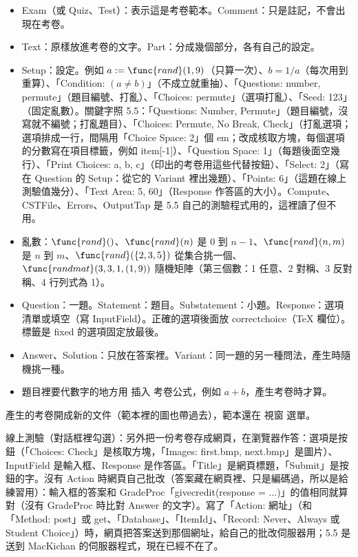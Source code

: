 \begin{itemize}
\item Exam（或 Quiz、Test）：表示這是考卷範本。Comment：只是註記，不會出現在考卷。
\item Text：原樣放進考卷的文字。Part：分成幾個部分，各有自己的設定。
\item Setup：設定。例如 $a:=\func{rand}(1,9)$（只算一次）、$b=1/a$（每次用到重算）、「Condition: $(a\neq b)$」（不成立就重抽）、「Questions: number, permute」（題目編號、打亂）、「Choices: permute」（選項打亂）、「Seed: 123」（固定亂數）。關鍵字照 5.5：「Questions: Number, Permute」（題目編號，沒寫就不編號；打亂題目）、「Choices: Permute, No Break, Check」（打亂選項；選項排成一行，間隔用「Choice Space: 2」個 em；改成核取方塊，每個選項的分數寫在項目標籤，例如 \TEXTsymbol{\backslash}item[-1]）、「Question Space: 1」（每題後面空幾行）、「Print Choices: a, b, c」（印出的考卷用這些代替按鈕）、「Select: 2」（寫在 Question 的 Setup：從它的 Variant 裡出幾題）、「Points: 6」（這題在線上測驗值幾分）、「Text Area: 5, 60」（Response 作答區的大小）。Compute、CSTFile、Errors、OutputTap 是 5.5 自己的測驗程式用的，這裡讀了但不用。
\item 亂數：$\func{rand}()$、$\func{rand}(n)$ 是 0 到 $n-1$、$\func{rand}(n,m)$ 是 $n$ 到 $m$、$\func{rand}(\{2,3,5\})$ 從集合挑一個、$\func{randmat}(3,3,1,(1,9))$ 隨機矩陣（第三個數：1 任意、2 對稱、3 反對稱、4 行列式為 1）。
\item Question：一題。Statement：題目。Substatement：小題。Response：選項清單或填空（寫 InputField）。正確的選項後面放 \TEXTsymbol{\backslash}correctchoice（TeX 欄位）。標籤是 fixed 的選項固定放最後。
\item Answer、Solution：只放在答案裡。Variant：同一題的另一種問法，產生時隨機挑一種。
\item 題目裡要代數字的地方用 插入 \TEXTsymbol{>} 考卷公式，例如 $a+b$，產生考卷時才算。
\end{itemize}

產生的考卷開成新的文件（範本裡的圖也帶過去），範本還在 視窗 選單。

線上測驗（對話框裡勾選）：另外把一份考卷存成網頁，在瀏覽器作答：選項是按鈕（「Choices: Check」是核取方塊，「Images: first.bmp, next.bmp」是圖片）、InputField 是輸入框、Response 是作答區。「Title」是網頁標題，「Submit」是按鈕的字。沒有 Action 時網頁自己批改（答案藏在網頁裡、只是編碼過，所以是給練習用）：輸入框的答案和 GradeProc「givecredit(response = ...)」的值相同就算對（沒有 GradeProc 時比對 Answer 的文字）。寫了「Action: 網址」（和「Method: post」或 get、「Database」、「ItemId」、「Record: Never、Always 或 Student Choice」）時，網頁把答案送到那個網址，給自己的批改伺服器用；5.5 是送到 MacKichan 的伺服器程式，現在已經不在了。

